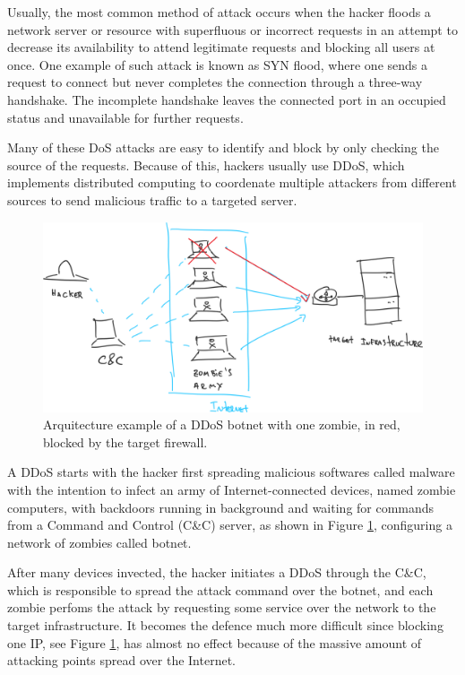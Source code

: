 \documentclass[a4paper,twoside]{article}
\begin{document}
Usually, the most common method of attack occurs when the hacker floods a network server or resource with superfluous or incorrect requests in an attempt to decrease its availability to attend legitimate requests and blocking all users at once. One example of such attack is known as SYN flood, where one sends a request to connect but never completes the connection through a three-way handshake. The incomplete handshake leaves the connected port in an occupied status and unavailable for further requests.

Many of these DoS attacks are easy to identify and block by only checking the source of the requests. Because of this, hackers usually use DDoS, which implements distributed computing to coordenate multiple attackers from different sources to send malicious traffic to a targeted server.

\begin{figure}[h]
	\centering
	\includegraphics[width=.9\linewidth]{img/DDoS-arch}
	\caption{Arquitecture example of a DDoS botnet with one zombie, in red, blocked by the target firewall.}
	\label{fig:DDoS-arch}
\end{figure}

A DDoS starts with the hacker first spreading malicious softwares called malware with the intention to infect an army of Internet-connected devices, named zombie computers, with backdoors running in background and waiting for commands from a Command and Control (C\&C) server, as shown in Figure \ref{fig:DDoS-arch}, configuring a network of zombies called botnet.

After many devices invected, the hacker initiates a DDoS through the C\&C, which is responsible to spread the attack command over the botnet, and each zombie perfoms the attack by requesting some service over the network to the target infrastructure. It becomes the defence much more difficult since blocking one IP, see Figure \ref{fig:DDoS-arch}, has almost no effect because of the massive amount of attacking points spread over the Internet.
\end{document}
